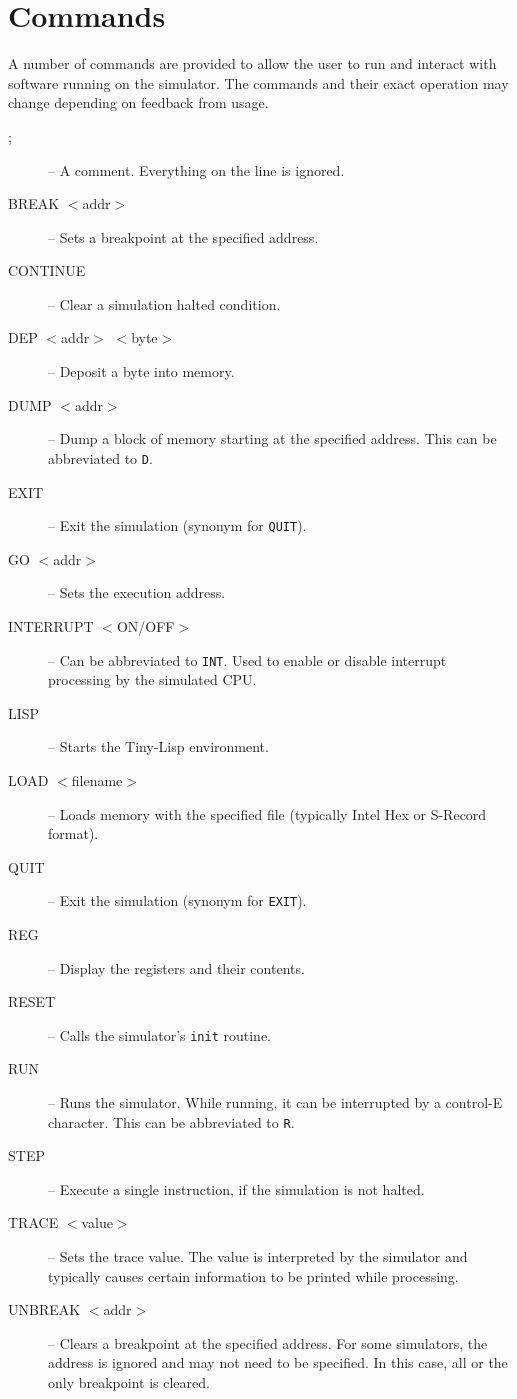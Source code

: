 \documentclass[10pt, openany]{book}
\begin{document}
\section{Commands}
A number of commands are provided to allow the user to run and interact with software running on the simulator.  The commands and their exact operation may change depending on feedback from usage.
\begin{description}
  \item[;] -- A comment.  Everything on the line is ignored.
  \item[BREAK $<$addr$>$] -- Sets a breakpoint at the specified address.
  \item[CONTINUE] -- Clear a simulation halted condition.
  \item[DEP $<$addr$>$ $<$byte$>$] -- Deposit a byte into memory.
  \item[DUMP $<$addr$>$] -- Dump a block of memory starting at the specified address.  This can be abbreviated to \verb|D|.
  \item[EXIT] -- Exit the simulation (synonym for \verb|QUIT|).
  \item[GO $<$addr$>$] -- Sets the execution address.
  \item[INTERRUPT $<$ON/OFF$>$] -- Can be abbreviated to \verb|INT|.  Used to enable or disable interrupt processing by the simulated CPU.  
  \item[LISP] -- Starts the Tiny-Lisp environment.
  \item[LOAD $<$filename$>$] -- Loads memory with the specified file (typically Intel Hex or S-Record format).
  \item[QUIT] -- Exit the simulation (synonym for \verb|EXIT|).
  \item[REG] -- Display the registers and their contents.
  \item[RESET] -- Calls the simulator's \verb|init| routine.
  \item[RUN] -- Runs the simulator.  While running, it can be interrupted by a control-E character.  This can be abbreviated to \verb|R|.
  \item[STEP] -- Execute a single instruction, if the simulation is not halted.
  \item[TRACE $<$value$>$] -- Sets the trace value.  The value is interpreted by the simulator and typically causes certain information to be printed while processing.
  \item[UNBREAK $<$addr$>$] -- Clears a breakpoint at the specified address.  For some simulators, the address is ignored and may not need to be specified.  In this case, all or the only breakpoint is cleared.
\end{description}
\end{document}
